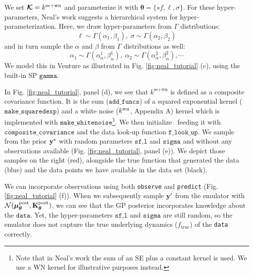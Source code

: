 We set $\bm{\mathcal{K}} = k^{\text{se}+\text{wn}}$ and parameterize it with $\bm{\theta}=\{sf,\ell,\sigma\}$.
For these hyper-parameters, Neal's work suggests a hierarchical system for
hyper-parameterization.
Here, we draw hyper-parameters from $\Gamma$ distributions:
\begin{equation}
\label{eq:hyper-ell}
\ell \sim \Gamma(\alpha_1,\beta_1),\;\sigma \sim \Gamma(\alpha_2,\beta_2)
\end{equation} 
and in turn sample the $\alpha$ and $\beta$ from $\Gamma$ distributions as well:
\begin{equation}
\label{eq:hyper-alpha}
\alpha_1 \sim \Gamma(\alpha^1_{\alpha},\beta^1_{ \alpha } ),\; \alpha_2 \sim \Gamma(\alpha^2_{\alpha},\beta^2_{\alpha}),\cdots
\end{equation}
We model this in Venture as illustrated in Fig. \ref{fig:neal_tutorial} (c),
using the built-in \ac{SP} $\texttt{gamma}$. 

In Fig. \ref{fig:neal_tutorial}, panel (d), we see that $k^{\text{se}+\text{wn}}$
is defined as a composite covariance function. It is the sum ($\texttt{add\_funcs}$) of
a squared exponential kernel ($\texttt{make\_squaredexp}$) and a white noise
($k^\text{wn}$, Appendix A)
kernel which is implemented with $\texttt{make\_whitenoise}$\footnote{Note
that in Neal's work \citeyearpar{neal1997monte} the sum of an SE
plus a constant kernel is used. We use a WN kernel for illustrative purposes
instead.}. 
We then initialize \gpmem\ feeding it with $\texttt{composite\_covariance}$ and the data
look-up function $\texttt{f\_look\_up}$. 
We sample from the prior $\mathbf{y}^*$ with random parameters $\texttt{sf,l}$ and $\texttt{sigma}$ and 
without any observations available (Fig. \ref{fig:neal_tutorial}, panel (e)).
We depict those samples on the right (red), alongside the true function that generated the data (blue) and
the data points we have available in the data set (black).

We can incorporate observations using both \texttt{observe} and \texttt{predict} (Fig. \ref{fig:neal_tutorial} (f)).
When we subsequently sample $\mathbf{y}^\prime$ from the emulator with
$\mathcal{N}(\bm{\mu}_{\bm{\theta}}^\text{post},\mathbf{K}_{\bm{\theta}}^\text{post})$, we can see that the \ac{GP} posterior incorporates knowledge 
about the $\texttt{data}$. Yet, the hyper-parameters $\texttt{sf,l}$ and $\texttt{sigma}$ are still
random, so the emulator does not capture the true underlying dynamics
($f_\text{true}$) of the \texttt{data} correctly. 

